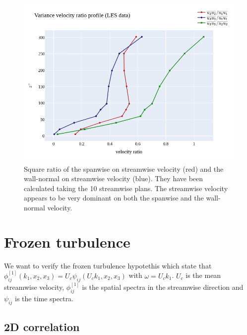 \documentclass[]{article}
\theoremstyle{plain}
\theoremstyle{remark}
\begin{document}
\begin{figure}[h!]
	\begin{center}
	\includegraphics[width=\textwidth]{../output/channel_wrles_retau395/RANS/velocity_ratio_profiles.png}
	\caption{Square ratio of the spanwise on streamwise velocity (red) and the wall-normal on streamwise velocity (blue). They have been calculated taking the 10 streamwise plans. The streamwise velocity appears to be very dominant on both the spanwise and the wall-normal velocity.}
	\end{center}
\end{figure}

\section{Frozen turbulence}
We want to verify the frozen turbulence hypotethis which state that $\phi_{ij}^{[1]}(k_1,x_2,x_3)=U_c\psi_{ij}(U_ck_1,x_2,x_3)$ with $\omega=U_ck_1$. $U_c$ is the mean streamwise velocity, $\phi_{ij}^{[1]}$ is the spatial spectra in the streamwise direction and $\psi_{ij}$ is the time spectra.

\subsection{2D correlation}
\end{document}
